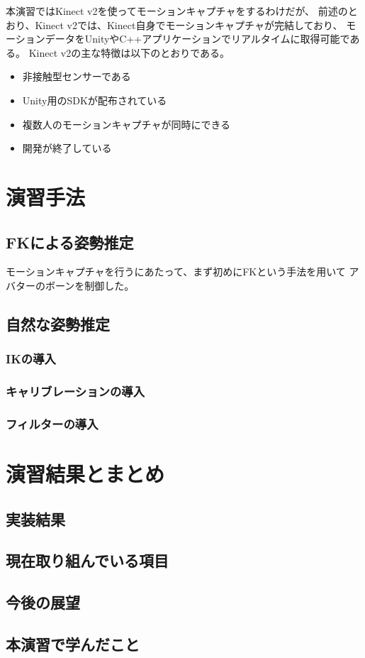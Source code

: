 \documentclass[a4j]{jsarticle}
\begin{document}
本演習ではKinect v2を使ってモーションキャプチャをするわけだが、
前述のとおり、Kinect v2では、Kinect自身でモーションキャプチャが完結しており、
モーションデータをUnityやC++アプリケーションでリアルタイムに取得可能である。
Kinect v2の主な特徴は以下のとおりである。

\begin{itemize}
  \item 非接触型センサーである
  \item Unity用のSDKが配布されている
  \item 複数人のモーションキャプチャが同時にできる
  \item 開発が終了している
\end{itemize}


\section{演習手法}

\subsection{FKによる姿勢推定}

モーションキャプチャを行うにあたって、まず初めにFKという手法を用いて
アバターのボーンを制御した。

\subsection{自然な姿勢推定}

\subsubsection{IKの導入}

\subsubsection{キャリブレーションの導入}

\subsubsection{フィルターの導入}

\section{演習結果とまとめ}

\subsection{実装結果}

\subsection{現在取り組んでいる項目}

\subsection{今後の展望}

\subsection{本演習で学んだこと}
\end{document}

